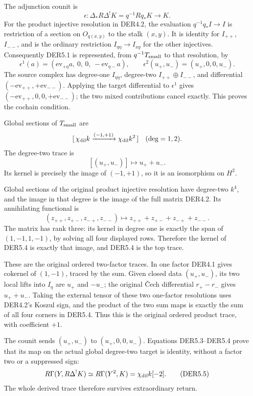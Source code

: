 The adjunction counit is \[
\epsilon:\Delta_*R\Delta^!K=q^{-1}Rq_*K\longrightarrow K.
\tag{DER5.1}
\] For the product injective resolution in DER4.2, the evaluation
\(q^{-1}q_*I\to I\) is restriction of a section on \(O_{q(x,y)}\) to the
stalk \((x,y)\). It is identity for \(I_{++}\), \(I_{--}\), and is the
ordinary restriction \(I_{\eta\eta}\to I_{xy}\) for the other
injectives. Consequently DER5.1 is represented, from
\(q^{-1}T_{\rm small}\) to that resolution, by \[
\epsilon^1(a)=
(\mathrm{ev}_{+\eta}a,\ 0,\ 0,\ -\mathrm{ev}_{\eta-}a),
\qquad
\epsilon^2(u_+,u_-)=(u_+,0,0,u_-).
\tag{DER5.2}
\] The source complex has degree-one \(I_{\eta\eta}\), degree-two
\(I_{++}\oplus I_{--}\), and differential
\((-\mathrm{ev}_{++},+\mathrm{ev}_{--})\). Applying the target
differential to \(\epsilon^1\) gives
\((-\mathrm{ev}_{++},0,0,+\mathrm{ev}_{--})\); the two mixed
contributions cancel exactly. This proves the cochain condition.

Global sections of \(T_{\rm small}\) are \[
[\,\chi_{\rm dil}k\xrightarrow{(-1,+1)}
 \chi_{\rm dil}k^2\,]\quad(\deg=1,2).
\] The degree-two trace is \[
[(u_+,u_-)]\longmapsto u_++u_-.
\tag{DER5.3}
\] Its kernel is precisely the image of \((-1,+1)\), so it is an
isomorphism on \(H^2\).

Global sections of the original product injective resolution have
degree-two \(k^4\), and the image in that degree is the image of the
full matrix DER4.2. Its annihilating functional is \[
(z_{++},z_{+-},z_{-+},z_{--})
 \longmapsto z_{++}+z_{+-}+z_{-+}+z_{--}.
\tag{DER5.4}
\] The matrix has rank three: its kernel in degree one is exactly the
span of \((1,-1,1,-1)\), by solving all four displayed rows. Therefore
the kernel of DER5.4 is exactly that image, and DER5.4 is the top trace.

These are the original ordered two-factor traces. In one factor DER4.1
gives cokernel of \((1,-1)\), traced by the sum. Given closed data
\((u_+,u_-)\), its two local lifts into \(I_\eta\) are \(u_+\) and
\(-u_-\); the original Čech differential \(r_+-r_-\) gives \(u_++u_-\).
Taking the external tensor of these two one-factor resolutions uses
DER4.2's Koszul sign, and the product of the two sum maps is exactly the
sum of all four corners in DER5.4. Thus this is the original ordered
product trace, with coefficient \(+1\).

The counit sends \((u_+,u_-)\) to \((u_+,0,0,u_-)\). Equations
DER5.3--DER5.4 prove that its map on the actual global degree-two target
is identity, without a factor two or a suppressed sign: \[
R\Gamma(Y,R\Delta^!K)\simeq
R\Gamma(Y^2,K)=\chi_{\rm dil}k[-2].
\tag{DER5.5}
\] The whole derived trace therefore survives extraordinary return.

